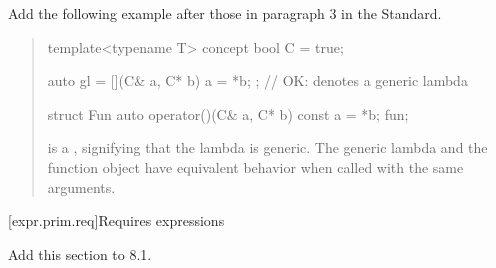 Add the following example after those in paragraph 3 in the 
\Cpp Standard.

\begin{quote}
\begin{addedblock}
\enterexample
\begin{codeblock}
template<typename T> concept bool C = true;

auto gl = [](C& a, C* b) { a = *b; }; // OK: denotes a generic lambda

struct Fun {
  auto operator()(C& a, C* b) const { a = *b; }
} fun;
\end{codeblock}
 is a 
,
signifying that the lambda is generic. The generic lambda 
and the function object  have equivalent behavior when 
called with the same arguments.
\exitexample
\end{addedblock}
\end{quote}

\setcounter{subsection}{6}
[expr.prim.req]{Requires expressions}

Add this section to 8.1.

